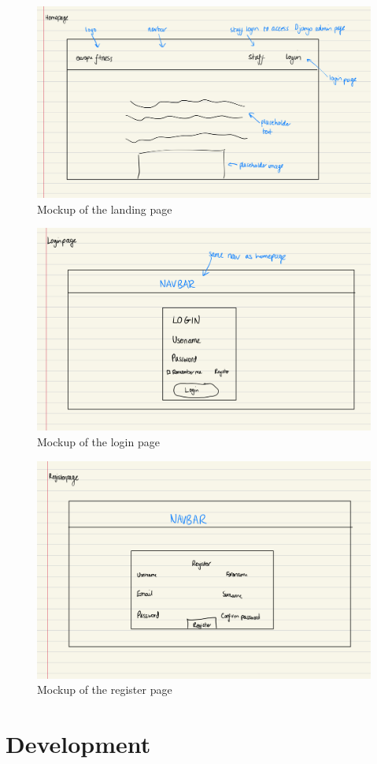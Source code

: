 \documentclass{article}
\begin{document}
\begin{figure}
  \centering
  \includegraphics[width=1\textwidth]{Figure 13.jpeg}
  \caption{Mockup of the landing page}
\end{figure}

\begin{figure}
  \centering
  \includegraphics[width=1\textwidth]{Figure 14.jpeg}
  \caption{Mockup of the login page}
\end{figure}

\begin{figure}
  \centering
  \includegraphics[width=1\textwidth]{Figure 15.jpeg}
  \caption{Mockup of the register page}
\end{figure}

\newpage

\section{Development}
\end{document}
